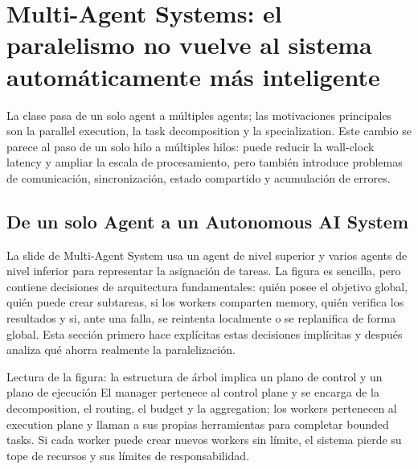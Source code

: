 \section{Multi-Agent Systems: el paralelismo no vuelve al sistema automáticamente más inteligente}

La clase pasa de un solo agent a múltiples agents; las motivaciones principales son la parallel execution, la task decomposition y la specialization. Este cambio se parece al paso de un solo hilo a múltiples hilos: puede reducir la wall-clock latency y ampliar la escala de procesamiento, pero también introduce problemas de comunicación, sincronización, estado compartido y acumulación de errores.

\subsection{De un solo Agent a un Autonomous AI System}

La slide de Multi-Agent System usa un agent de nivel superior y varios agents de nivel inferior para representar la asignación de tareas. La figura es sencilla, pero contiene decisiones de arquitectura fundamentales: quién posee el objetivo global, quién puede crear subtareas, si los workers comparten memory, quién verifica los resultados y si, ante una falla, se reintenta localmente o se replanifica de forma global. Esta sección primero hace explícitas estas decisiones implícitas y después analiza qué ahorra realmente la paralelización.


\begin{knowledgebox}{Lectura de la figura: la estructura de árbol implica un plano de control y un plano de ejecución}
El manager pertenece al control plane y se encarga de la decomposition, el routing, el budget y la aggregation; los workers pertenecen al execution plane y llaman a sus propias herramientas para completar bounded tasks. Si cada worker puede crear nuevos workers sin límite, el sistema pierde su tope de recursos y sus límites de responsabilidad.
\end{knowledgebox}


